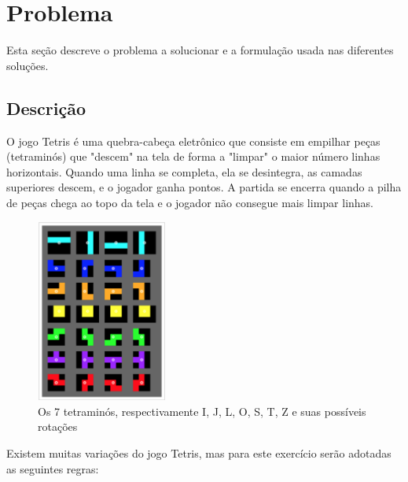 \section{Problema}
\label{sec:problem}

Esta seção descreve o problema a solucionar e a formulação usada nas diferentes soluções.

\subsection{Descrição}
\label{subsec:description}

O jogo Tetris é uma quebra-cabeça eletrônico que consiste em empilhar peças (tetraminós) que "descem" na tela de forma a "limpar" o maior número linhas horizontais. Quando uma linha se completa, ela se desintegra, as camadas superiores descem, e o jogador ganha pontos. A partida se encerra quando a pilha de peças chega ao topo da tela e o jogador não consegue mais limpar linhas.

\begin{figure}[H]
	\centering
	\includegraphics[height=6cm]{images/pieces}
	\caption{Os 7 tetraminós, respectivamente I, J, L, O, S, T, Z e suas possíveis rotações}
	\label{fig:tetraminos}
\end{figure}

Existem muitas variações do jogo Tetris, mas para este exercício serão adotadas as seguintes regras:

